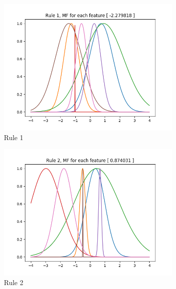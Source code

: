 \documentclass[11pt,a4paper]{article}
\begin{document}
\begin{figure}[htbp]
\begin{subfigure}{\columnwidth}
  \centering
  \includegraphics[width=\columnwidth,keepaspectratio]{rule-1.png}  
  \caption{Rule 1}
  \label{fig:rules:rule-1}
\end{subfigure}
\begin{subfigure}{\columnwidth}
  \centering
  \includegraphics[width=\columnwidth,keepaspectratio]{rule-2.png}  
  \caption{Rule 2}
  \label{fig:rules:rule-2}
\end{subfigure}
\begin{subfigure}{\columnwidth}
  \centering

\end{subfigure}
\end{figure}
\end{document}
